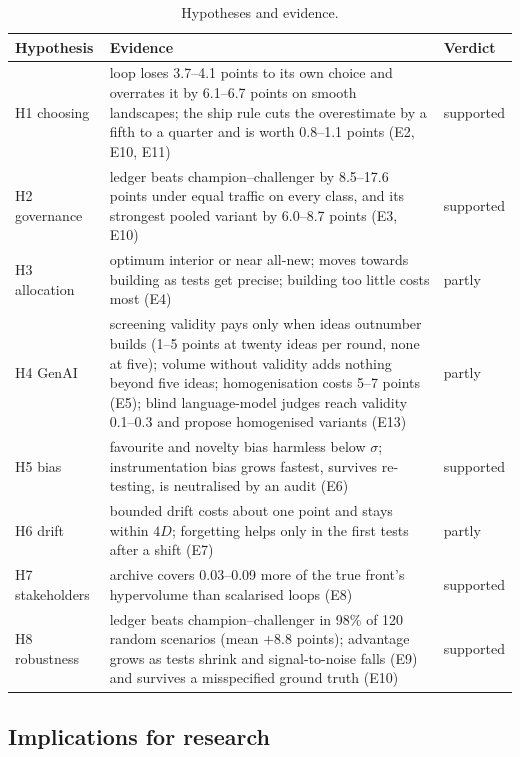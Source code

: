 \documentclass[preprint,12pt,authoryear]{elsarticle}
\theoremstyle{definition}
\begin{document}
\begin{table}[!tbp]
\caption{Hypotheses and evidence.}
\label{tab:hyp}
\centering\footnotesize
\begin{tabularx}{\textwidth}{@{}P{2.6cm}LP{1.55cm}@{}}
\toprule
Hypothesis & Evidence & Verdict\\
\midrule
H1 choosing & loop loses 3.7--4.1 points to its own choice and overrates it by 6.1--6.7 points on smooth landscapes; the ship rule cuts the overestimate by a fifth to a quarter and is worth 0.8--1.1 points (E2, E10, E11) & supported\\
H2 governance & ledger beats champion--challenger by 8.5--17.6 points under equal traffic on every class, and its strongest pooled variant by 6.0--8.7 points (E3, E10) & supported\\
H3 allocation & optimum interior or near all-new; moves towards building as tests get precise; building too little costs most (E4) & partly\\
H4 GenAI & screening validity pays only when ideas outnumber builds (1--5 points at twenty ideas per round, none at five); volume without validity adds nothing beyond five ideas; homogenisation costs 5--7 points (E5); blind language-model judges reach validity 0.1--0.3 and propose homogenised variants (E13) & partly\\
H5 bias & favourite and novelty bias harmless below $\sigma$; instrumentation bias grows fastest, survives re-testing, is neutralised by an audit (E6) & supported\\
H6 drift & bounded drift costs about one point and stays within $4D$; forgetting helps only in the first tests after a shift (E7) & partly\\
H7 stakeholders & archive covers 0.03--0.09 more of the true front's hypervolume than scalarised loops (E8) & supported\\
H8 robustness & ledger beats champion--challenger in 98\% of 120 random scenarios (mean $+8.8$ points); advantage grows as tests shrink and signal-to-noise falls (E9) and survives a misspecified ground truth (E10) & supported\\
\bottomrule
\end{tabularx}
\end{table}

\subsection{Implications for research}
\end{document}
